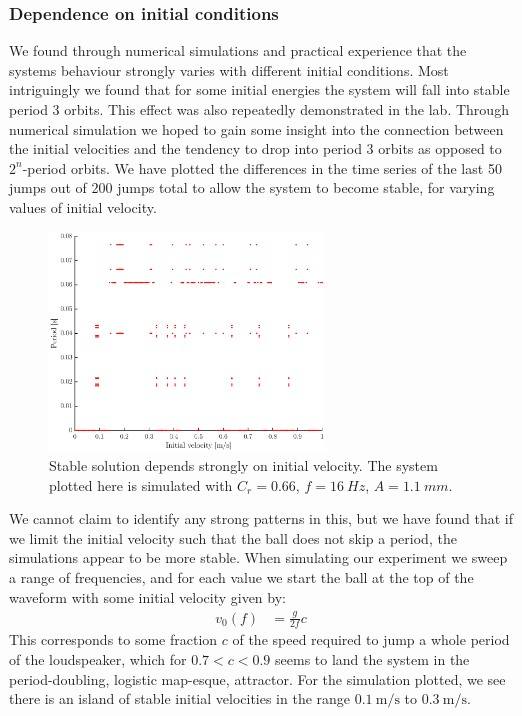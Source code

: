 \documentclass[12pt,oneside,a4paper]{article}
\numberwithin{equation}{section}
\begin{document}
{{{{\subsubsection{Dependence on initial conditions}
We found through numerical simulations and practical experience that the systems behaviour strongly varies with different initial conditions. Most intriguingly we found that for some initial energies the system will fall into stable period 3 orbits. This effect was also repeatedly demonstrated in the lab. Through numerical simulation we hoped to gain some insight into the connection between the initial velocities and the tendency to drop into period 3 orbits as opposed to $2^n$-period orbits. We have plotted the differences in the time series of the last 50 jumps out of 200 jumps total to allow the system to become stable, for varying values of initial velocity. 
\begin{figure}[h]
\centering
\includegraphics[width=0.65\textwidth]{vsweep.eps}
\caption{Stable solution depends strongly on initial velocity. The system plotted here is simulated with $C_r=0.66$, $f=\SI{16}{Hz}$, $A=\SI{1.1}{mm}$.}
\end{figure}
We cannot claim to identify any strong patterns in this, but we have found that if we limit the initial velocity such that the ball does not skip a period, the simulations appear to be more stable. When simulating our experiment we sweep a range of frequencies, and for each value we start the ball at the top of the waveform with some initial velocity given by:
\begin{align*}
v_0(f) &= \frac{g}{2f} c
\end{align*}
This corresponds to some fraction $c$ of the speed required to jump a whole period of the loudspeaker, which for $0.7<c<0.9$ seems to land the system in the period-doubling, logistic map-esque, attractor. For the simulation plotted, we see there is an island of stable initial velocities in the range $\SI{0.1}{\meter\per\second}$ to $\SI{0.3}{\meter\per\second}$.
}}}}
\end{document}
